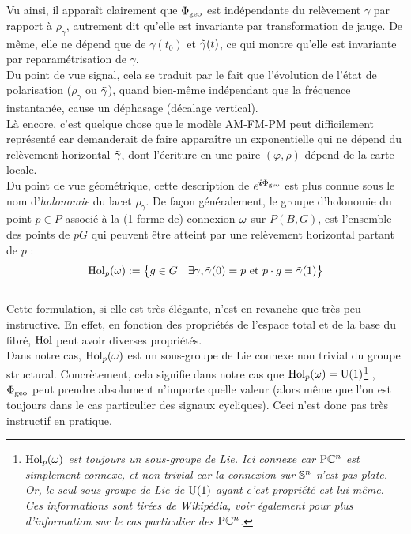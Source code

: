 \noindent Vu ainsi, il apparaît clairement que $\phaseg$ est indépendante du relèvement $\gamma$ par rapport à $\rho_\gamma$, autrement dit qu'elle est invariante par transformation de jauge. 
De même, elle ne dépend que de $\gamma(t_0)$ et $\Tilde{\gamma}(t)$, ce qui montre qu'elle est invariante par reparamétrisation de $\gamma$.
\\

Du point de vue signal, cela se traduit par le fait que l'évolution de l'état de polarisation ($\rho_\gamma$ ou $\Tilde{\gamma}$), quand bien-même indépendant que la fréquence instantanée, cause un déphasage (décalage vertical). \\
Là encore, c'est quelque chose que le modèle AM-FM-PM peut difficilement représenté car demanderait de faire apparaître un exponentielle qui ne dépend du relèvement horizontal $\Tilde{\gamma}$, dont l'écriture en une paire $(\varphi,\rho)$ dépend de la carte locale.
\\ 

Du point de vue géométrique, cette description de  $e^{\i \phaseg}$ est plus connue sous le nom d’\emph{holonomie} du lacet $\rho_\gamma$. De façon généralement, le groupe d'holonomie du point $p\in P$ associé à la (1-forme de) connexion $\conn$ sur $P(B,G)$, est l'ensemble des points de $pG$ qui peuvent être atteint par une relèvement horizontal partant de $p$ :
\begin{equation} \label{eq:def2Hol}
	\Hol_p(\conn) \defeq \big\{ g\in G\ |\ \exists \gamma, \Tilde{\gamma}(0) = p \text{ et } p\cdot g = \Tilde{\gamma}(1) \big\}
\end{equation}
\\
Cette formulation, si elle est très élégante, n'est en revanche que très peu instructive. En effet, en fonction des propriétés de l'espace total et de la base du fibré, $\Hol$ peut avoir diverses propriétés. 
\\
Dans notre cas, $\Hol_p(\conn)$ est un sous-groupe de Lie connexe non trivial du groupe structural. Concrètement, cela signifie dans notre cas que $\Hol_p(\conn)=\U{1}$\footnote{\itshape
	$\Hol_p(\conn)$ est toujours un sous-groupe de Lie. Ici connexe car $\PC{n}$ est simplement connexe, et non trivial car la connexion sur $\S{n}$ n'est pas plate.  Or, le seul sous-groupe de Lie de $\U{1}$ ayant c'est propriété est lui-même. Ces informations sont tirées de Wikipédia, voir également \cite[sec. 8.5.3]{nakahara_geometry_2003} pour plus d'information sur le cas particulier des $\PC{n}$.}
, \ie~$\phaseg$ peut prendre absolument n'importe quelle valeur (alors même que l'on est toujours dans le cas particulier des signaux cycliques). Ceci n'est donc pas très instructif en pratique.
\\



